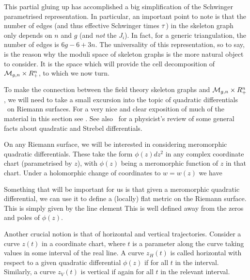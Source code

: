 This partial gluing up has accomplished a big simplification of the 
Schwinger parametrised representation. In particular, an
important point to note is that the number of edges (and thus effective
Schwinger times ${\tau}$) in the skeleton
graph only depends on $n$ 
and $g$ (and {\it not} the $J_i$). In fact, for a generic triangulation, 
the number of edges is $6g-6+3n$. 
The universality of this representation, 
so to say, is the reason why the moduli space of skeleton graphs is the more
natural object to consider. It is the space which will provide the cell
decomposition of ${\cal M}_{g,n}\times R_+^n$, to which we now turn.


To make the connection between the field theory skeleton graphs and 
${\cal M}_{g,n}\times R_+^n$, we will need to take a small excursion
into the topic of quadratic differentials \streb\ on Riemann surfaces. 
For a very nice and clear exposition of much of the material in this 
section see \mp . See also \sunil\ for a physicist's review of some 
general facts about quadratic and Strebel differentials.


On any Riemann surface, we will be interested in
considering meromorphic quadratic differentials. These take the
form $\phi(z)dz^2$ in any complex coordinate chart (parametrised by $z$),
with $\phi(z)$ being a meromorphic function of $z$ in that chart.
Under a holomorphic change of coordinates to $w=w(z)$ we have
\eqn{}

Something that will be important for us is 
that given a meromorphic quadratic differential, we can use it to 
define a (locally) flat metric on the Riemann surface.
This is simply given by the line element
\eqn{}
This is well defined away from the zeros and poles of $\phi(z)$.
 
Another crucial notion is that 
of horizontal and vertical trajectories. Consider a 
curve $z(t)$ in a coordinate chart, where $t$ is a parameter along the 
curve taking values in some interval of the real line. A curve $z_H(t)$ is 
called horizontal with respect to a given quadratic differential $\phi(z)$
if 
\eqn{}
for all $t$ in the interval. 
Similarly, a curve $z_V(t)$ is vertical if 
\eqn{}
again for all $t$ in the relevant interval. 

